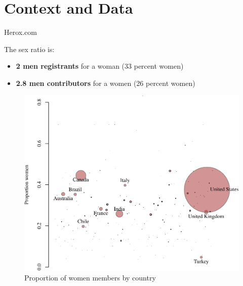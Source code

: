 \section{Context and Data}\label{context-and-data}

\begin{frame}{Herox.com}

The sex ratio is:

\begin{itemize}
\tightlist
\item
  \textbf{2 men registrants} for a woman (33 percent women)
\item
  \textbf{2.8 men contributors} for a women (26 percent women)
\end{itemize}

\end{frame}

\begin{frame}

\begin{figure}
\centering
\includegraphics{deck_files/figure-beamer/bayes-1.pdf}
\caption{Proportion of women members by country}
\end{figure}

\end{frame}

